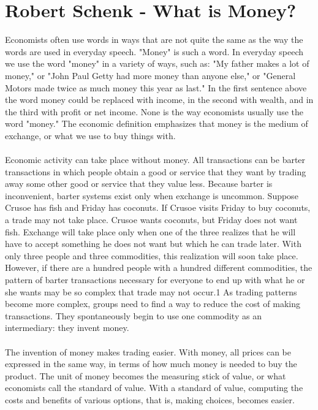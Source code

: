 \section*{Robert Schenk - What is Money? \cite{articleschenk}}

Economists often use words in ways that are not quite the same as the way the words are used in everyday speech. "Money" is such a word. In everyday speech we use the word "money" in a variety of ways, such as: "My father makes a lot of money," or "John Paul Getty had more money than anyone else," or "General Motors made twice as much money this year as last." In the first sentence above the word money could be replaced with income, in the second with wealth, and in the third with profit or net income. None is the way economists usually use the word "money." The economic definition emphasizes that money is the medium of exchange, or what we use to buy things with. \\ \\
Economic activity can take place without money. All transactions can be barter transactions in which people obtain a good or service that they want by trading away some other good or service that they value less. Because barter is inconvenient, barter systems exist only when exchange is uncommon. Suppose Crusoe has fish and Friday has coconuts. If Crusoe visits Friday to buy coconuts, a trade may not take place. Crusoe wants coconuts, but Friday does not want fish. Exchange will take place only when one of the three realizes that he will have to accept something he does not want but which he can trade later. With only three people and three commodities, this realization will soon take place. However, if there are a hundred people with a hundred different commodities, the pattern of barter transactions necessary for everyone to end up with what he or she wants may be so complex that trade may not occur.1 As trading patterns become more complex, groups need to find a way to reduce the cost of making transactions. They spontaneously begin to use one commodity as an intermediary: they invent money. \\ \\
The invention of money makes trading easier. With money, all prices can be expressed in the same way, in terms of how much money is needed to buy the product. The unit of money becomes the measuring stick of value, or what economists call the standard of value. With a standard of value, computing the costs and benefits of various options, that is, making choices, becomes easier. \\ 
